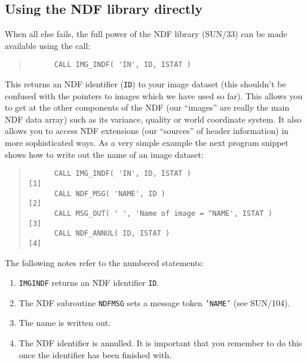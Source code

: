 \documentclass[twoside,11pt]{article}
\newcommand{\htmlref}[2]{#1}
\newcommand{\xref}[3]{#1}
\renewcommand{\_}{\texttt{\symbol{95}}}
\newcommand{\myverb}[1]{{\texttt{#1}}}
\newcommand{\mynote}{The following notes refer to the numbered statements:}
\newenvironment{code}{\begin{small} \begin{quote}}
                     {\end{quote} \end{small}}
\newenvironment{enumnotes}
{
   \renewcommand{\labelenumi}{\myverb{[\theenumi]}}
   \begin{enumerate}
}{
   \end{enumerate}
   \renewcommand{\labelenumi}{\theenumi}
}
\renewenvironment{enumnotes}
  {
    \begin{enumerate}
  }{
    \end{enumerate}
  }
\begin{document}
\subsection{Using the NDF library directly}
When all else fails, the full power of the NDF library
(\xref{SUN/33}{sun33}{}) can be made available using the call:
\begin{code}
\begin{verbatim}
      CALL IMG_INDF( 'IN', ID, ISTAT )
\end{verbatim}
\end{code}
This returns an NDF identifier (\myverb{ID}) to your image dataset
(this shouldn't be confused with the pointers to images which we have
used so far). This allows you to get at the other components of the
NDF (our ``images'' are really the main NDF data array) such as its
variance, quality or world coordinate system. It also allows you to
access NDF extensions (our ``sources'' of header information) in more
sophisticated ways.  As a very simple example the next program snippet
shows how to write out the name of an image dataset:
\begin{code}
\begin{verbatim}
      CALL IMG_INDF( 'IN', ID, ISTAT )                        [1]
      CALL NDF_MSG( 'NAME', ID )                              [2]
      CALL MSG_OUT( ' ', 'Name of image = ^NAME', ISTAT )     [3]
      CALL NDF_ANNUL( ID, ISTAT )                             [4]
\end{verbatim}
\end{code}
\mynote
\begin{enumnotes}
\item
\htmlref{\myverb{IMG\_INDF}}{IMG_INDF} returns an NDF identifier \myverb{ID}.

\item
The NDF subroutine \myverb{NDF\_MSG} sets a message token \myverb{'NAME'}
(see \xref{SUN/104}{sun104}{}).

\item
The name is written out.

\item
The NDF identifier is annulled. It is important that you remember to
do this once the identifier has been finished with.
\end{enumnotes}
\end{document}
